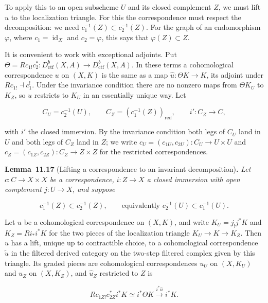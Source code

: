 \documentclass[11pt]{article}
\newenvironment{bpstatement}[2]{\par\addvspace{0.6\baselineskip}\noindent\textbf{#1}#2\textbf{.}\enspace\ignorespaces}
  {\par\addvspace{0.4\baselineskip}}
\newenvironment{bpstatementit}[2]{\begin{bpstatement}{#1}{#2}\itshape\ignorespaces}{\end{bpstatement}}
\begin{document}
\label{bp216}%
To apply this to an open subscheme \(U\) and its closed complement \(Z\), we must lift \(u\) to the localization triangle. For this the correspondence must respect the decomposition: we need \(c_1^{-1}(Z)\subset c_2^{-1}(Z)\). For the graph of an endomorphism \(\varphi\), where \(c_1=\operatorname{id}_X\) and \(c_2=\varphi\), this says that \(\varphi(Z)\subset Z\).

It is convenient to work with exceptional adjoints. Put \(\Theta=Rc_{1!}c_2^*:D^b_{\mathrm{ctf}}(X,A)\to D^b_{\mathrm{ctf}}(X,A)\). In these terms a cohomological correspondence \(u\) on \((X,K)\) is the same as a map \(\widehat u:\Theta K\to K\), its adjoint under \(Rc_{1!}\dashv c_1^!\). Under the invariance condition there are no nonzero maps from \(\Theta K_U\) to \(K_Z\), so \(u\) restricts to \(K_U\) in an essentially unique way. Let

\[
C_U=c_2^{-1}(U),\qquad C_Z=(c_1^{-1}(Z))_{\mathrm{red}},\qquad
i':C_Z\longrightarrow C,
\]

with \(i'\) the closed immersion. By the invariance condition both legs of \(C_U\) land in \(U\) and both legs of \(C_Z\) land in \(Z\); we write \(c_U=(c_{1U},c_{2U}):C_U\to U\times U\) and \(c_Z=(c_{1Z},c_{2Z}):C_Z\to Z\times Z\) for the restricted correspondences.

\label{bp217}%
\begin{bpstatementit}{Lemma~11.17}{ (Lifting a correspondence to an invariant decomposition)}
Let \(c:C\to X\times X\) be a correspondence, \(i:Z\to X\) a closed immersion with open complement \(j:U\to X\), and suppose

\[
c_1^{-1}(Z)\subset c_2^{-1}(Z),
\qquad\text{equivalently }c_2^{-1}(U)\subset c_1^{-1}(U).
\]

Let \(u\) be a cohomological correspondence on \((X,K)\), and write \(K_U=j_!j^*K\) and \(K_Z=Ri_*i^*K\) for the two pieces of the localization triangle \(K_U\to K\to K_Z\). Then \(u\) has a lift, unique up to contractible choice, to a cohomological correspondence \(\tilde u\) in the filtered derived category on the two-step filtered complex given by this triangle. Its graded pieces are cohomological correspondences \(u_U\) on \((X,K_U)\) and \(u_Z\) on \((X,K_Z)\), and \(\widehat u_Z\) restricted to \(Z\) is

\[
Rc_{1Z!}c_{2Z}^*i^*K\simeq i^*\Theta K
\xrightarrow{i^*\widehat u}i^*K.
\]
\end{bpstatementit}
\end{document}
